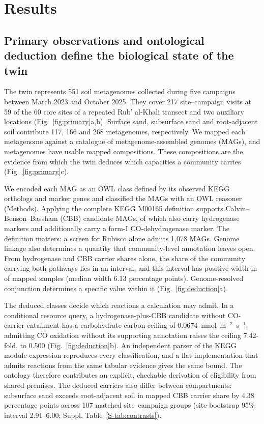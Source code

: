 \documentclass[11pt,a4paper]{article}
\begin{document}
\section{Results}
\subsection{Primary observations and ontological deduction define the biological state of the twin}
The twin represents 551 soil metagenomes collected during five campaigns between March 2023 and October 2025. They cover 217 site--campaign visits at 59 of the 60 core sites of a repeated Rub' al-Khali transect and two auxiliary locations (Fig.~\ref{fig:primary}a,b). Surface sand, subsurface sand and root-adjacent soil contribute 117, 166 and 268 metagenomes, respectively. We mapped each metagenome against a catalogue of \ReferenceMAGs{} metagenome-assembled genomes (MAGs), and \MappedSamples{} metagenomes have usable mapped compositions. These compositions are the evidence from which the twin deduces which capacities a community carries (Fig.~\ref{fig:primary}c).

We encoded each MAG as an OWL class defined by its observed KEGG orthologs and marker genes and classified the MAGs with an OWL reasoner (Methods). Applying the complete KEGG M00165 definition supports \CBBFull{} Calvin--Benson--Bassham (CBB) candidate MAGs, of which \HtwoCBB{} also carry hydrogenase markers and \DualHtwoCO{} additionally carry a form-I CO-dehydrogenase marker. The definition matters: a screen for Rubisco alone admits 1,078 MAGs. Genome linkage also determines a quantity that community-level annotation leaves open. From hydrogenase and CBB carrier shares alone, the share of the community carrying both pathways lies in an interval, and this interval has positive width in \AmbiguousSamples{} of \MappedSamples{} mapped samples (median width 6.13 percentage points). Genome-resolved conjunction determines a specific value within it (Fig.~\ref{fig:deduction}a).

The deduced classes decide which reactions a calculation may admit. In a conditional resource query, a hydrogenase-plus-CBB candidate without CO-carrier entailment has a carbohydrate-carbon ceiling of 0.0674~nmol~m$^{-2}$~s$^{-1}$; admitting CO oxidation without its supporting annotation raises the ceiling 7.42-fold, to 0.500 (Fig.~\ref{fig:deduction}b). An independent parser of the KEGG module expression reproduces every classification, and a flat implementation that admits reactions from the same tabular evidence gives the same bound. The ontology therefore contributes an explicit, checkable derivation of eligibility from shared premises. The deduced carriers also differ between compartments: subsurface sand exceeds root-adjacent soil in mapped CBB carrier share by 4.38 percentage points across 107 matched site--campaign groups (site-bootstrap 95\% interval 2.91--6.00; Suppl. Table~\ref{S-tab:contrasts}).
\end{document}
